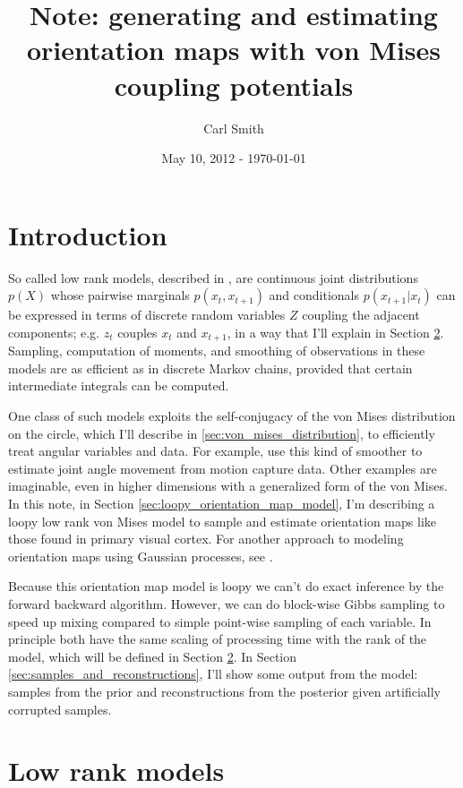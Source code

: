 \documentclass[11pt]{article}
\newcommand{\paperlink}[1]{\href{../../../../papers/#1.pdf}{\cite{#1}}}
\begin{document}
\title{Note: generating and estimating orientation maps with von Mises coupling potentials}
\author{Carl Smith}
\date{May 10, 2012 - \today}
\maketitle

\section{Introduction}

So called low rank models, described in \paperlink{Smith_2012}, are continuous joint distributions $p(X)$ whose pairwise marginals $p(x_t,x_{t+1})$ and conditionals $p(x_{t+1}|x_t)$ can be expressed in terms of discrete random variables $Z$ coupling the adjacent components; e.g. $z_t$ couples $x_t$ and $x_{t+1}$, in a way that I'll explain in Section \ref{sec:low_rank_models}. Sampling, computation of moments, and smoothing of observations in these models are as efficient as in discrete Markov chains, provided that certain intermediate integrals can be computed.

One class of such models exploits the self-conjugacy of the von Mises distribution on the circle, which I'll describe in \ref{sec:von_mises_distribution}, to efficiently treat angular variables and data. For example, \paperlink{Smith_2012} use this kind of smoother to estimate joint angle movement from motion capture data. Other examples are imaginable, even in higher dimensions with a generalized form of the von Mises. In this note, in Section \ref{sec:loopy_orientation_map_model}, I'm describing a loopy low rank von Mises model to sample and estimate orientation maps like those found in primary visual cortex. For another approach to modeling orientation maps using Gaussian processes, see \paperlink{Macke_2009}.

Because this orientation map model is loopy we can't do exact inference by the forward backward algorithm. However, we can do block-wise Gibbs sampling to speed up mixing compared to simple point-wise sampling of each variable. In principle both have the same scaling of processing time with the rank of the model, which will be defined in Section \ref{sec:low_rank_models}. In Section \ref{sec:samples_and_reconstructions}, I'll show some output from the model: samples from the prior and reconstructions from the posterior given artificially corrupted samples.


\section{Low rank models}
\label{sec:low_rank_models}
\end{document}
